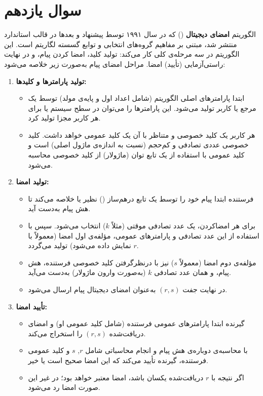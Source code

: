 \documentclass{report}
\begin{document}
\section{سوال یازدهم}

الگوریتم \textbf{امضای دیجیتال } () که در سال ۱۹۹۱ توسط  پیشنهاد و بعدها در قالب استاندارد  منتشر شد، مبتنی بر مفاهیم گروه‌های انتخابی و توابع گسسته لگاریتم است. این الگوریتم در سه مرحله‌ی کلی کار می‌کند: تولید کلید، امضا کردن پیام، و در نهایت راستی‌آزمایی (تأیید) امضا. مراحل امضای پیام به‌صورت زیر خلاصه می‌شود:

\begin{enumerate}
    \item \textbf{تولید پارامترها و کلیدها:}
    \begin{itemize}
        \item ابتدا پارامترهای اصلی الگوریتم (شامل اعداد اول و پایه‌ی مولد) توسط یک مرجع یا کاربر تولید می‌شود. این پارامترها را می‌توان در سطح سیستم یا برای هر کاربر مجزا تولید کرد.
        \item هر کاربر یک کلید خصوصی و متناظر با آن یک کلید عمومی خواهد داشت. کلید خصوصی عددی تصادفی و کم‌حجم (نسبت به اندازه‌ی ماژول اصلی) است و کلید عمومی با استفاده از یک تابع توان (ماژولار) از کلید خصوصی محاسبه می‌شود.
    \end{itemize}
    
    \item \textbf{تولید امضا:}
    \begin{itemize}
        \item فرستنده ابتدا پیام خود را توسط یک تابع درهم‌ساز () نظیر  یا  خلاصه می‌کند تا هش پیام به‌دست آید.
        \item برای هر امضاکردن، یک عدد تصادفی موقتی (مثلاً $k$) انتخاب می‌شود. سپس با استفاده از این عدد تصادفی و پارامترهای عمومی، مؤلفه‌ی اول امضا (معمولاً با $r$ نمایش داده می‌شود) تولید می‌گردد.
        \item مؤلفه‌ی دوم امضا (معمولاً $s$) نیز با درنظرگرفتن کلید خصوصی فرستنده، هش پیام، و همان عدد تصادفی $k$ (به‌صورت وارون ماژولار) به‌دست می‌آید.
        \item در نهایت جفت $(r, s)$ به‌عنوان امضای دیجیتال پیام ارسال می‌شود.
    \end{itemize}
    
    \item \textbf{تأیید امضا:}
    \begin{itemize}
        \item گیرنده ابتدا پارامترهای عمومی فرستنده (شامل کلید عمومی او) و امضای دریافت‌شده $(r, s)$ را استخراج می‌کند.
        \item با محاسبه‌ی دوباره‌ی هش پیام و انجام محاسباتی شامل $r$, $s$ و کلید عمومی فرستنده، گیرنده تأیید می‌کند که این امضا صحیح است یا خیر.
        \item اگر نتیجه با $r$ دریافت‌شده یکسان باشد، امضا معتبر خواهد بود؛ در غیر این صورت امضا رد می‌شود.
    \end{itemize}
\end{enumerate}
\end{document}
